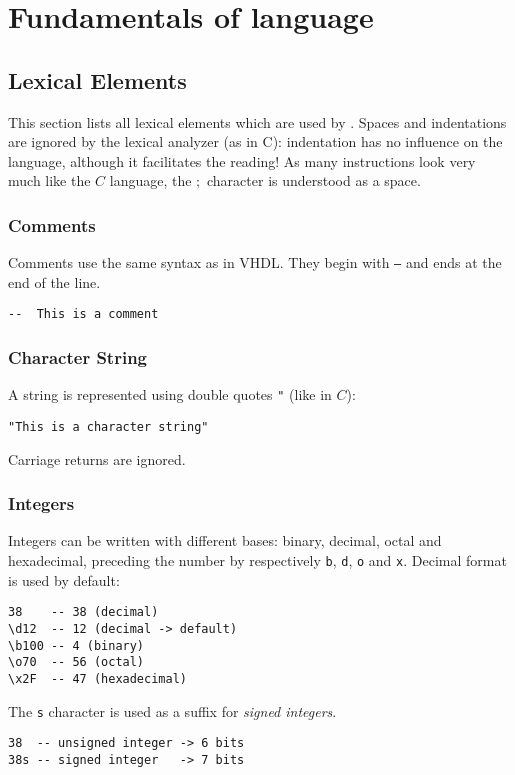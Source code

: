 \chapter{Fundamentals of language}
\section{Lexical Elements}
This section lists all lexical elements which are used by \harmless. Spaces and indentations are ignored by the lexical analyzer (as in C): indentation has no influence on the language, although it facilitates the reading!
As many instructions look very much like the $C$ language, the $;$ character is understood as a space.

\subsection{Comments}
\label{sec:commentaire}
Comments use the same syntax as in VHDL. They begin with \texttt{--} and ends at the end of the line.

\begin{lstlisting}
--  This is a comment
\end{lstlisting}

\subsection{Character String}
\label{sec:chaines}
A string is represented using double quotes \texttt{"} (like in $C$):
\begin{lstlisting}
"This is a character string"
\end{lstlisting}
Carriage returns are ignored.

\subsection{Integers}
\label{sec:nombres}
Integers can be written with different bases: binary, decimal, octal and hexadecimal, preceding the number by respectively \texttt{\bs b}, \texttt{\bs d}, \texttt{\bs o} and \texttt{\bs x}. Decimal format is used by default:
\begin{lstlisting}
38    -- 38 (decimal)
\d12  -- 12 (decimal -> default)
\b100 -- 4 (binary)
\o70  -- 56 (octal)
\x2F  -- 47 (hexadecimal)
\end{lstlisting}

The \texttt{s} character is used as a suffix for \emph{signed integers}.
\begin{lstlisting}
38  -- unsigned integer -> 6 bits
38s -- signed integer   -> 7 bits
\end{lstlisting}


